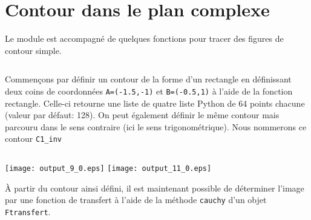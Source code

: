 \section{Contour dans le plan complexe\label{contour-dans-le-plan-complexe}}
Le module est accompagné de quelques fonctions pour tracer des figures
de contour simple.
\begin{tcolorbox}[breakable, size=fbox, boxrule=1pt, 
    pad at break*=1mm,colback=cellbackground, colframe=cellborder]
\inputminted{python}{codes/python/annexe_cauchy_cellule4.py}
\end{tcolorbox}

Commençons par définir un contour de la forme d'un rectangle en
définissant deux coins de coordonnées \texttt{A=(-1.5,-1)} et
\texttt{B=(-0.5,1)} à l'aide de la fonction rectangle. Celle-ci retourne
une liste de quatre liste Python de 64 points chacune (valeur par
défaut: 128).
On peut également définir le même contour mais parcouru dans le sens
contraire (ici le sens trigonométrique). Nous nommerons ce contour
\texttt{C1\_inv}

\begin{tcolorbox}[breakable, size=fbox, boxrule=1pt, 
    pad at break*=1mm,colback=cellbackground, colframe=cellborder]
\inputminted{python}{codes/python/annexe_cauchy_cellule5.py}
\end{tcolorbox}
\begin{center}
    \texttt{[image: output\_9\_0.eps]}
    \texttt{[image: output\_11\_0.eps]}
\end{center}
À partir du contour ainsi défini, il est maintenant possible de déterminer 
l'image par une fonction de transfert à l'aide de la méthode \texttt{cauchy}
d'un objet \texttt{Ftransfert}.
